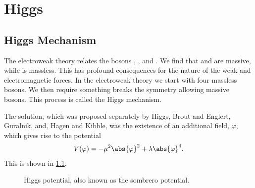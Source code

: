 \documentclass[fleqn]{NotesClass}
\DeclareMathOperator{\Re}{Re}
\DeclareMathOperator{\Im}{Im}
\begin{document}
    \chapter{Higgs}
    \section{Higgs Mechanism}
    The electroweak theory relates the bosons \PWpm, \PZzero, and \Pphoton.
    We find that \PWpm{} and \PZzero{} are massive, while \Pphoton{} is massless.
    This has profound consequences for the nature of the weak and electromagnetic forces.
    In the electroweak theory we start with four massless bosons.
    We then require something breaks the symmetry allowing massive bosons.
    This process is called the Higgs mechanism.
    
    The solution, which was proposed separately by Higgs, Brout and Englert, Guralnik, and, Hagen and Kibble, was the existence of an additional field, \(\varphi\), which gives rise to the potential
    \begin{equation}
        V(\varphi) = -\mu^2\abs{\varphi}^2 + \lambda\abs{\varphi}^4.
    \end{equation}
    This is shown in \cref{fig:higgs potential}.
    
    \begin{figure}
        \caption[Higgs potential.]{Higgs potential, also known as the sombrero potential.}
        \label{fig:higgs potential}
    \end{figure}
    
\end{document}
